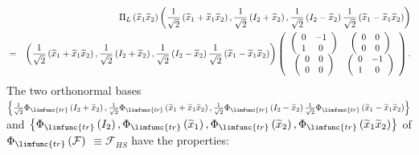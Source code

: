 \documentclass[aps,preprint]{revtex4}
\begin{document}
\begin{eqnarray}
&&\Pi _{L}\left( \widetilde{x}_{1}\widetilde{x}_{2}\right) \left( \frac{1}{%
\sqrt{2}}\left( \widetilde{x}_{1}+\widetilde{x}_{1}\widetilde{x}_{2}\right) ,%
\frac{1}{\sqrt{2}}\left( I_{2}+\widetilde{x}_{2}\right) ,\frac{1}{\sqrt{2}}%
\left( I_{2}-\widetilde{x}_{2}\right) \frac{1}{\sqrt{2}}\left( \widetilde{x}%
_{1}-\widetilde{x}_{1}\widetilde{x}_{2}\right) \right) \\
&=&\left( \frac{1}{\sqrt{2}}\left( \widetilde{x}_{1}+\widetilde{x}_{1}%
\widetilde{x}_{2}\right) ,\frac{1}{\sqrt{2}}\left( I_{2}+\widetilde{x}%
_{2}\right) ,\frac{1}{\sqrt{2}}\left( I_{2}-\widetilde{x}_{2}\right) \frac{1%
}{\sqrt{2}}\left( \widetilde{x}_{1}-\widetilde{x}_{1}\widetilde{x}%
_{2}\right) \right) \left( 
\begin{array}{cc}
\left( 
\begin{array}{cc}
0 & -1 \\ 
1 & 0%
\end{array}%
\right) & \left( 
\begin{array}{cc}
0 & 0 \\ 
0 & 0%
\end{array}%
\right) \\ 
\left( 
\begin{array}{cc}
0 & 0 \\ 
0 & 0%
\end{array}%
\right) & \left( 
\begin{array}{cc}
0 & -1 \\ 
1 & 0%
\end{array}%
\right)%
\end{array}%
\right) .
\end{eqnarray}%
The two orthonormal bases $\left\{ \frac{1}{\sqrt{2}}\Phi _{\limfunc{tr}%
}\left( I_{2}+\widetilde{x}_{2}\right) ,\frac{1}{\sqrt{2}}\Phi _{\limfunc{tr}%
}\left( \widetilde{x}_{1}+\widetilde{x}_{1}\widetilde{x}_{2}\right) ,\frac{1%
}{\sqrt{2}}\Phi _{\limfunc{tr}}\left( I_{2}-\widetilde{x}_{2}\right) \frac{1%
}{\sqrt{2}}\Phi _{\limfunc{tr}}\left( \widetilde{x}_{1}-\widetilde{x}_{1}%
\widetilde{x}_{2}\right) \right\} $ and $\left\{ \Phi _{\limfunc{tr}}\left(
I_{2}\right) ,\Phi _{\limfunc{tr}}\left( \widetilde{x}_{1}\right) ,\Phi _{%
\limfunc{tr}}\left( \widetilde{x}_{2}\right) ,\Phi _{\limfunc{tr}}\left( 
\widetilde{x}_{1}\widetilde{x}_{2}\right) \right\} $ of $\Phi _{\limfunc{tr}%
}\left( \mathcal{F}\right) $ $\equiv \mathcal{F}_{HS}$ have the properties:
\end{document}
